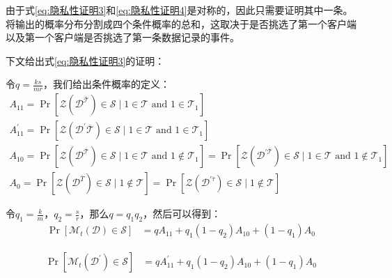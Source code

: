 由于式\ref{eq:隐私性证明3}和\ref{eq:隐私性证明4}是对称的，因此只需要证明其中一条。将输出的概率分布分割成四个条件概率的总和，这取决于是否挑选了第一个客户端以及第一个客户端是否挑选了第一条数据记录的事件。

下文给出式\ref{eq:隐私性证明3}的证明：

令$q=\frac{k s}{m r}$，我们给出条件概率的定义：
\begin{equation}\label{eq:隐私性证明5}
\begin{array}{l}
A_{11}=\operatorname{Pr}\left[\mathcal{Z}\left(\mathcal{D}^{\overline{\mathcal{T}}}\right) \in \mathcal{S} \mid 1 \in \mathcal{T} \text { and } 1 \in \mathcal{T}_{1}\right] \\
A_{11}^{\prime}=\operatorname{Pr}\left[\mathcal{Z}\left(\mathcal{D}^{\prime} \overline{\mathcal{T}}\right) \in \mathcal{S} \mid 1 \in \mathcal{T} \text { and } 1 \in \mathcal{T}_{1}\right] \\
A_{10}=\operatorname{Pr}\left[\mathcal{Z}\left(\mathcal{D}^{\overline{\mathcal{T}}}\right) \in \mathcal{S} \mid 1 \in \mathcal{T} \text { and } 1 \notin \mathcal{T}_{1}\right]=\operatorname{Pr}\left[\mathcal{Z}\left(\mathcal{D}^{\prime \overline{\mathcal{T}}}\right) \in \mathcal{S} \mid 1 \in \mathcal{T} \text { and } 1 \notin \mathcal{T}_{1}\right] \\
A_{0}=\operatorname{Pr}\left[\mathcal{Z}\left(\mathcal{D}^{\bar{T}}\right) \in \mathcal{S} \mid 1 \notin \mathcal{T}\right]=\operatorname{Pr}\left[\mathcal{Z}\left(\mathcal{D}^{\prime \bar{\tau}}\right) \in \mathcal{S} \mid 1 \notin \mathcal{T}\right]
\end{array}
\end{equation}

令$q_{1}=\frac{k}{m}$，$q_{2}=\frac{s}{r}$，那么$q=q_{1} q_{2}$，然后可以得到：
\begin{equation}\label{eq:隐私性证明6}
\begin{aligned} 
\operatorname{Pr}\left[\mathcal{M}_{t}(\mathcal{D}) \in \mathcal{S}\right] &=q A_{11}+q_{1}\left(1-q_{2}\right) A_{10}+\left(1-q_{1}\right) A_{0}
\end{aligned}
\end{equation}

\begin{equation}\label{eq:隐私性证明7}
\begin{aligned} 
\operatorname{Pr}\left[\mathcal{M}_{t}\left(\mathcal{D}^{\prime}\right) \in \mathcal{S}\right] &=q A_{11}^{\prime}+q_{1}\left(1-q_{2}\right) A_{10}+\left(1-q_{1}\right) A_{0} 
\end{aligned}
\end{equation}

